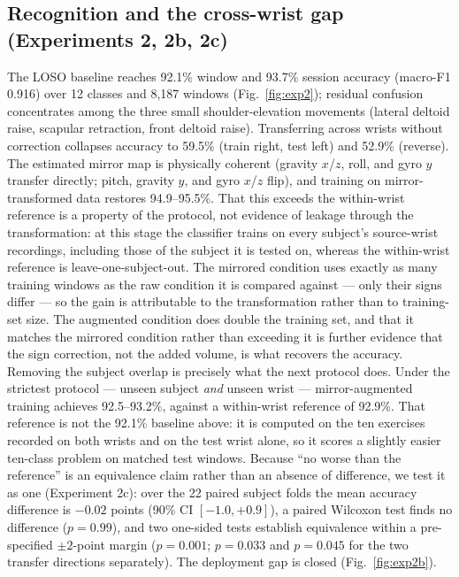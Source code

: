 \documentclass[conference]{IEEEtran}
\begin{document}
\subsection{Recognition and the cross-wrist gap (Experiments 2, 2b, 2c)}
The LOSO baseline reaches 92.1\% window and 93.7\% session accuracy
(macro-F1 0.916) over 12 classes and 8{,}187 windows
(Fig.~\ref{fig:exp2}); residual confusion concentrates among the three
small shoulder-elevation movements (lateral deltoid raise, scapular
retraction, front deltoid raise). Transferring across wrists without
correction collapses accuracy to 59.5\% (train right, test left) and
52.9\% (reverse). The estimated mirror map is physically coherent
(gravity $x$/$z$, roll, and gyro $y$ transfer directly; pitch, gravity
$y$, and gyro $x$/$z$ flip), and training on mirror-transformed data
restores 94.9--95.5\%. That this exceeds the within-wrist reference is
a property of the protocol, not evidence of leakage through the
transformation: at this stage the classifier trains on every subject's
source-wrist recordings, including those of the subject it is tested
on, whereas the within-wrist reference is leave-one-subject-out. The
mirrored condition uses exactly as many training windows as the raw
condition it is compared against --- only their signs differ --- so the
gain is attributable to the transformation rather than to training-set
size. The augmented condition does double the training set, and that
it matches the mirrored condition rather than exceeding it is further
evidence that the sign correction, not the added volume, is what
recovers the accuracy. Removing the subject overlap is precisely what
the next protocol does. Under the strictest protocol --- unseen subject
\emph{and} unseen wrist --- mirror-augmented training achieves
92.5--93.2\%, against a within-wrist reference of 92.9\%. That
reference is not the 92.1\% baseline above: it is computed on the
ten exercises recorded on both wrists and on the test wrist alone, so
it scores a slightly easier ten-class problem on matched test windows.
Because
``no worse than the reference'' is an equivalence claim rather than an
absence of difference, we test it as one (Experiment 2c): over the 22
paired subject folds the mean accuracy difference is $-0.02$ points
(90\% CI $[-1.0, +0.9]$), a paired Wilcoxon test finds no difference
($p = 0.99$), and two one-sided tests establish equivalence within a
pre-specified $\pm 2$-point margin ($p = 0.001$; $p = 0.033$ and
$p = 0.045$ for the two transfer directions separately). The
deployment gap is closed
(Fig.~\ref{fig:exp2b}).
\end{document}
